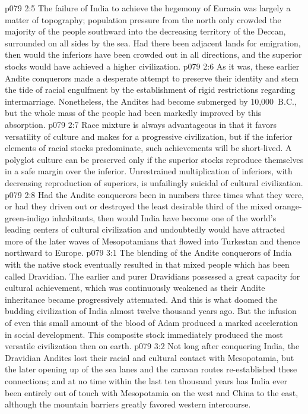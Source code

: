 \vs p079 2:5 The failure of India to achieve the hegemony of Eurasia was largely a matter of topography; population pressure from the north only crowded the majority of the people southward into the decreasing territory of the Deccan, surrounded on all sides by the sea. Had there been adjacent lands for emigration, then would the inferiors have been crowded out in all directions, and the superior stocks would have achieved a higher civilization.
\vs p079 2:6 As it was, these earlier Andite conquerors made a desperate attempt to preserve their identity and stem the tide of racial engulfment by the establishment of rigid restrictions regarding intermarriage. Nonetheless, the Andites had become submerged by 10,000~B.C., but the whole mass of the people had been markedly improved by this absorption.
\pc \vs p079 2:7 Race mixture is always advantageous in that it favors versatility of culture and makes for a progressive civilization, but if the inferior elements of racial stocks predominate, such achievements will be short\hyp{}lived. A polyglot culture can be preserved only if the superior stocks reproduce themselves in a safe margin over the inferior. Unrestrained multiplication of inferiors, with decreasing reproduction of superiors, is unfailingly suicidal of cultural civilization.
\vs p079 2:8 Had the Andite conquerors been in numbers three times what they were, or had they driven out or destroyed the least desirable third of the mixed orange\hyp{}green\hyp{}indigo inhabitants, then would India have become one of the world’s leading centers of cultural civilization and undoubtedly would have attracted more of the later waves of Mesopotamians that flowed into Turkestan and thence northward to Europe.
\vs p079 3:1 The blending of the Andite conquerors of India with the native stock eventually resulted in that mixed people which has been called Dravidian. The earlier and purer Dravidians possessed a great capacity for cultural achievement, which was continuously weakened as their Andite inheritance became progressively attenuated. And this is what doomed the budding civilization of India almost twelve thousand years ago. But the infusion of even this small amount of the blood of Adam produced a marked acceleration in social development. This composite stock immediately produced the most versatile civilization then on earth.
\vs p079 3:2 Not long after conquering India, the Dravidian Andites lost their racial and cultural contact with Mesopotamia, but the later opening up of the sea lanes and the caravan routes re\hyp{}established these connections; and at no time within the last ten thousand years has India ever been entirely out of touch with Mesopotamia on the west and China to the east, although the mountain barriers greatly favored western intercourse.
